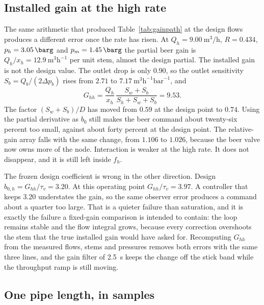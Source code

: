 \subsection{Installed gain at the high rate}

The same arithmetic that produced Table~\ref{tab:gainpath} at the design flows produces a different error once the rate has risen. At $Q_h=\SI{9.00}{\cubic\metre\per\hour}$, $R=0.434$, $p_h=\SI{3.05}{\barg}$ and $p_m=\SI{1.45}{\barg}$ the partial beer gain is $Q_h/x_h=12.9\ \mathrm{m}^3\mathrm{h}^{-1}$ per unit stem, almost the design partial. The installed gain is not the design value. The outlet drop is only \SI{0.90}{\barg}, so the outlet sensitivity $S_b=Q_b/(2\Delta p_b)$ rises from $2.71$ to $7.17\ \mathrm{m}^3\mathrm{h}^{-1}\mathrm{bar}^{-1}$, and
\begin{equation}
G_{hh} = \frac{Q_h}{x_h}\,\frac{S_w+S_b}{S_h+S_w+S_b} = 9.53.
\end{equation}
The factor $(S_w+S_b)/D$ has moved from $0.59$ at the design point to $0.74$. Using the partial derivative as $b_0$ still makes the beer command about twenty-six percent too small, against about forty percent at the design point. The relative-gain array falls with the same change, from $1.106$ to $1.026$, because the beer valve now owns more of the node. Interaction is weaker at the high rate. It does not disappear, and it is still left inside $f_h$.

The frozen design coefficient is wrong in the other direction. Design $b_{0,h}=G_{hh}/\tau_v=3.20$. At this operating point $G_{hh}/\tau_v=3.97$. A controller that keeps $3.20$ understates the gain, so the same observer error produces a command about a quarter too large. That is a quieter failure than saturation, and it is exactly the failure a fixed-gain comparison is intended to contain: the loop remains stable and the flow integral grows, because every correction overshoots the stem that the true installed gain would have asked for. Recomputing $G_{hh}$ from the measured flows, stems and pressures removes both errors with the same three lines, and the gain filter of \SI{2.5}{s} keeps the change off the stick band while the throughput ramp is still moving.

\subsection{One pipe length, in samples}

